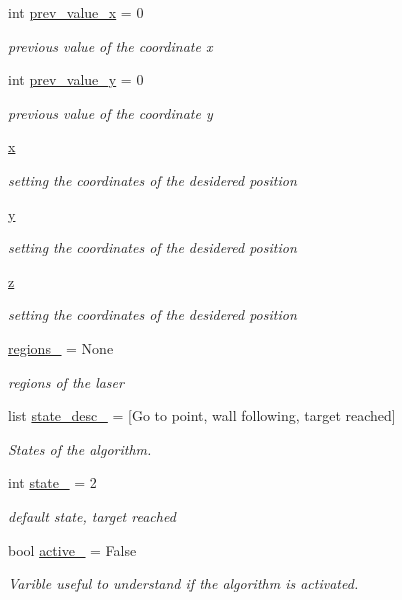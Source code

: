 \begin{DoxyCompactItemize}
int \hyperlink{namespacebug__m_a1ab2c8fb582b2d935edf3a0193a45a15}{prev\+\_\+value\+\_\+x} = 0
\begin{DoxyCompactList}\small\item\em previous value of the coordinate x \end{DoxyCompactList}\item 
int \hyperlink{namespacebug__m_a4fc6d4a9e55a524cbc2a80a7f0d57553}{prev\+\_\+value\+\_\+y} = 0
\begin{DoxyCompactList}\small\item\em previous value of the coordinate y \end{DoxyCompactList}\item 
\hyperlink{namespacebug__m_af10f89c7f929c9babce108f5d7382996}{x}
\begin{DoxyCompactList}\small\item\em setting the coordinates of the desidered position \end{DoxyCompactList}\item 
\hyperlink{namespacebug__m_ab8596d2ae799585b0d89152b55891aa8}{y}
\begin{DoxyCompactList}\small\item\em setting the coordinates of the desidered position \end{DoxyCompactList}\item 
\hyperlink{namespacebug__m_afbb54887da57b97920c8d36c6daed1fc}{z}
\begin{DoxyCompactList}\small\item\em setting the coordinates of the desidered position \end{DoxyCompactList}\item 
\hyperlink{namespacebug__m_ac9d4d95c034fca5a2b5d08ea845bbfcb}{regions\+\_\+} = None
\begin{DoxyCompactList}\small\item\em regions of the laser \end{DoxyCompactList}\item 
list \hyperlink{namespacebug__m_ae70f71d3816862f72790fae7bfaa543b}{state\+\_\+desc\+\_\+} = \mbox{[}\textquotesingle{}Go to point\textquotesingle{}, \textquotesingle{}wall following\textquotesingle{}, \textquotesingle{}target reached\textquotesingle{}\mbox{]}
\begin{DoxyCompactList}\small\item\em States of the algorithm. \end{DoxyCompactList}\item 
int \hyperlink{namespacebug__m_a79dc362dff5bef439beacdd5c0c3b2f1}{state\+\_\+} = 2
\begin{DoxyCompactList}\small\item\em default state, target reached \end{DoxyCompactList}\item 
bool \hyperlink{namespacebug__m_aac2be257b1acdebfb27dab0e311550d4}{active\+\_\+} = False
\begin{DoxyCompactList}\small\item\em Varible useful to understand if the algorithm is activated. \end{DoxyCompactList}\end{DoxyCompactItemize}


